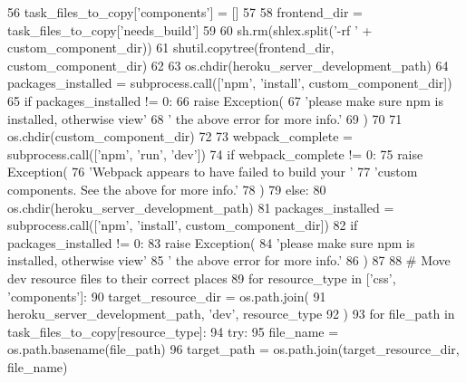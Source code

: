 \begin{DoxyCode}
56         task\_files\_to\_copy[\textcolor{stringliteral}{'components'}] = []
57 
58         frontend\_dir = task\_files\_to\_copy[\textcolor{stringliteral}{'needs\_build'}]
59 
60         sh.rm(shlex.split(\textcolor{stringliteral}{'-rf '} + custom\_component\_dir))
61         shutil.copytree(frontend\_dir, custom\_component\_dir)
62 
63         os.chdir(heroku\_server\_development\_path)
64         packages\_installed = subprocess.call([\textcolor{stringliteral}{'npm'}, \textcolor{stringliteral}{'install'}, custom\_component\_dir])
65         \textcolor{keywordflow}{if} packages\_installed != 0:
66             \textcolor{keywordflow}{raise} Exception(
67                 \textcolor{stringliteral}{'please make sure npm is installed, otherwise view'}
68                 \textcolor{stringliteral}{' the above error for more info.'}
69             )
70 
71         os.chdir(custom\_component\_dir)
72 
73         webpack\_complete = subprocess.call([\textcolor{stringliteral}{'npm'}, \textcolor{stringliteral}{'run'}, \textcolor{stringliteral}{'dev'}])
74         \textcolor{keywordflow}{if} webpack\_complete != 0:
75             \textcolor{keywordflow}{raise} Exception(
76                 \textcolor{stringliteral}{'Webpack appears to have failed to build your '}
77                 \textcolor{stringliteral}{'custom components. See the above for more info.'}
78             )
79     \textcolor{keywordflow}{else}:
80         os.chdir(heroku\_server\_development\_path)
81         packages\_installed = subprocess.call([\textcolor{stringliteral}{'npm'}, \textcolor{stringliteral}{'install'}, custom\_component\_dir])
82         \textcolor{keywordflow}{if} packages\_installed != 0:
83             \textcolor{keywordflow}{raise} Exception(
84                 \textcolor{stringliteral}{'please make sure npm is installed, otherwise view'}
85                 \textcolor{stringliteral}{' the above error for more info.'}
86             )
87 
88     \textcolor{comment}{# Move dev resource files to their correct places}
89     \textcolor{keywordflow}{for} resource\_type \textcolor{keywordflow}{in} [\textcolor{stringliteral}{'css'}, \textcolor{stringliteral}{'components'}]:
90         target\_resource\_dir = os.path.join(
91             heroku\_server\_development\_path, \textcolor{stringliteral}{'dev'}, resource\_type
92         )
93         \textcolor{keywordflow}{for} file\_path \textcolor{keywordflow}{in} task\_files\_to\_copy[resource\_type]:
94             \textcolor{keywordflow}{try}:
95                 file\_name = os.path.basename(file\_path)
96                 target\_path = os.path.join(target\_resource\_dir, file\_name)

\end{DoxyCode}
